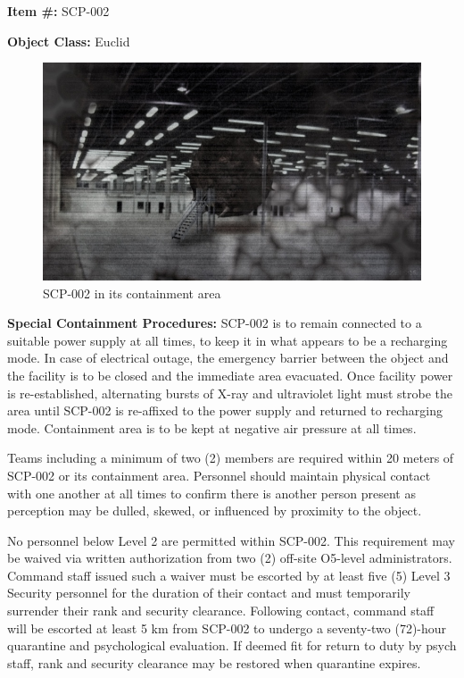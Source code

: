 \textbf{Item \#:} SCP-002

\textbf{Object Class:} Euclid

\begin{figure}[h]
\begin{center}
\includegraphics[scale=0.3]{scp/002.jpg}
\linebreak SCP-002 in its containment area
\end{center}
\end{figure}

\textbf{Special Containment Procedures:} SCP-002 is to remain connected to a suitable power supply at all times, to keep it in what appears to be a recharging mode. In case of electrical outage, the emergency barrier between the object and the facility is to be closed and the immediate area evacuated. Once facility power is re-established, alternating bursts of X-ray and ultraviolet light must strobe the area until SCP-002 is re-affixed to the power supply and returned to recharging mode. Containment area is to be kept at negative air pressure at all times.

Teams including a minimum of two (2) members are required within 20 meters of SCP-002 or its containment area. Personnel should maintain physical contact with one another at all times to confirm there is another person present as perception may be dulled, skewed, or influenced by proximity to the object.

No personnel below Level 2 are permitted within SCP-002. This requirement may be waived via written authorization from two (2) off-site O5-level administrators. Command staff issued such a waiver must be escorted by at least five (5) Level 3 Security personnel for the duration of their contact and must temporarily surrender their rank and security clearance. Following contact, command staff will be escorted at least 5 km from SCP-002 to undergo a seventy-two (72)-hour quarantine and psychological evaluation. If deemed fit for return to duty by psych staff, rank and security clearance may be restored when quarantine expires.


